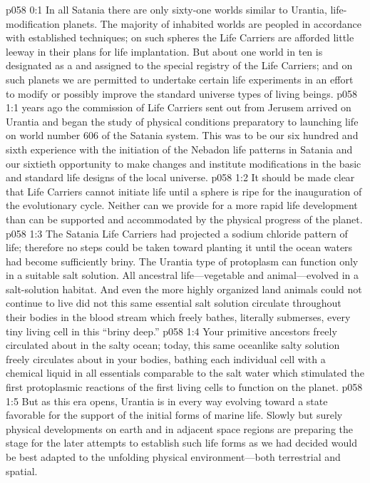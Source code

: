 \author{Life Carrier}
\vs p058 0:1 In all Satania there are only sixty\hyp{}one worlds similar to Urantia, life\hyp{}modification planets. The majority of inhabited worlds are peopled in accordance with established techniques; on such spheres the Life Carriers are afforded little leeway in their plans for life implantation. But about one world in ten is designated as a  and assigned to the special registry of the Life Carriers; and on such planets we are permitted to undertake certain life experiments in an effort to modify or possibly improve the standard universe types of living beings.\plusone
{}
\vs p058 1:1  years ago the commission of Life Carriers sent out from Jerusem arrived on Urantia and began the study of physical conditions preparatory to launching life on world number 606 of the Satania system. This was to be our six hundred and sixth experience with the initiation of the Nebadon life patterns in Satania and our sixtieth opportunity to make changes and institute modifications in the basic and standard life designs of the local universe.
\pc \vs p058 1:2 It should be made clear that Life Carriers cannot initiate life until a sphere is ripe for the inauguration of the evolutionary cycle. Neither can we provide for a more rapid life development than can be supported and accommodated by the physical progress of the planet.
\vs p058 1:3 The Satania Life Carriers had projected a sodium chloride pattern of life; therefore no steps could be taken toward planting it until the ocean waters had become sufficiently briny. The Urantia type of protoplasm can function only in a suitable salt solution. All ancestral life---vegetable and animal---evolved in a salt\hyp{}solution habitat. And even the more highly organized land animals could not continue to live did not this same essential salt solution circulate throughout their bodies in the blood stream which freely bathes, literally submerses, every tiny living cell in this “briny deep.”
\vs p058 1:4 Your primitive ancestors freely circulated about in the salty ocean; today, this same oceanlike salty solution freely circulates about in your bodies, bathing each individual cell with a chemical liquid in all essentials comparable to the salt water which stimulated the first protoplasmic reactions of the first living cells to function on the planet.
\vs p058 1:5 But as this era opens, Urantia is in every way evolving toward a state favorable for the support of the initial forms of marine life. Slowly but surely physical developments on earth and in adjacent space regions are preparing the stage for the later attempts to establish such life forms as we had decided would be best adapted to the unfolding physical environment---both terrestrial and spatial.
